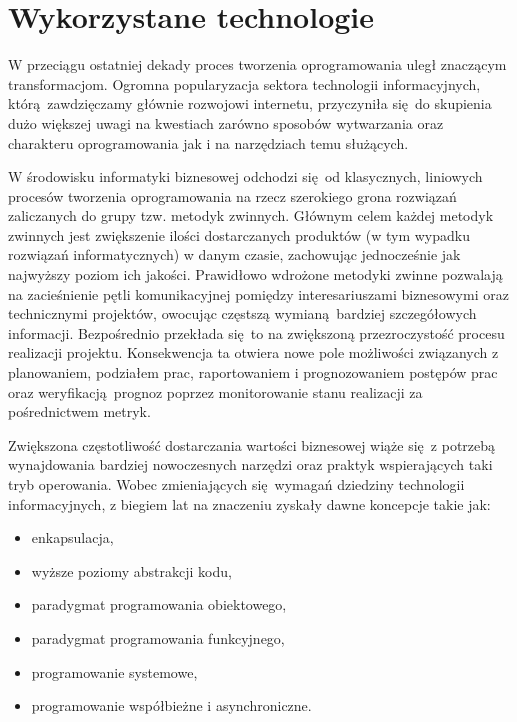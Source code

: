 \section{Wykorzystane technologie}\label{ss_internals-technologies}
W przeciągu ostatniej dekady proces tworzenia oprogramowania uległ znaczącym
transformacjom.
Ogromna popularyzacja sektora technologii informacyjnych, którą zawdzięczamy głównie rozwojowi internetu, przyczyniła się do skupienia dużo większej uwagi na kwestiach zarówno sposobów wytwarzania oraz charakteru oprogramowania jak i na narzędziach temu służących.

W środowisku informatyki biznesowej odchodzi się od klasycznych, liniowych procesów tworzenia oprogramowania na rzecz szerokiego grona rozwiązań zaliczanych do grupy tzw. metodyk zwinnych. 
Głównym celem każdej metodyk zwinnych jest zwiększenie ilości dostarczanych produktów (w tym wypadku rozwiązań informatycznych) w danym czasie, zachowując jednocześnie jak najwyższy poziom ich jakości.
Prawidłowo wdrożone metodyki zwinne pozwalają na zacieśnienie pętli komunikacyjnej pomiędzy interesariuszami biznesowymi oraz technicznymi projektów, owocując częstszą wymianą bardziej szczegółowych informacji.
Bezpośrednio przekłada się to na zwiększoną przezroczystość procesu realizacji projektu.
Konsekwencja ta otwiera nowe pole możliwości związanych z planowaniem, podziałem prac, raportowaniem i prognozowaniem postępów prac oraz weryfikacją prognoz poprzez monitorowanie stanu realizacji za pośrednictwem metryk.

\par{
Zwiększona częstotliwość dostarczania wartości biznesowej wiąże się z potrzebą wynajdowania bardziej nowoczesnych narzędzi oraz praktyk wspierających taki tryb operowania.
Wobec zmieniających się wymagań dziedziny technologii informacyjnych, z biegiem lat na znaczeniu zyskały dawne koncepcje takie jak:

\begin{itemize}
  \item enkapsulacja,
  \item wyższe poziomy abstrakcji kodu,
  \item paradygmat programowania obiektowego,
  \item paradygmat programowania funkcyjnego,
  \item programowanie systemowe,
  \item programowanie współbieżne i asynchroniczne.
\end{itemize}
}

